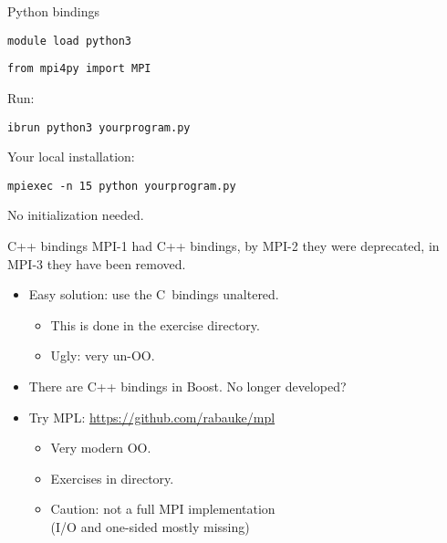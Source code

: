 \begin{numberedframe}{Python bindings}
\begin{verbatim}
module load python3
\end{verbatim}
\begin{verbatim}
from mpi4py import MPI
\end{verbatim}
Run:
\begin{tacc}
\begin{verbatim}
ibrun python3 yourprogram.py
\end{verbatim}
\end{tacc}
Your local installation:
\begin{verbatim}
mpiexec -n 15 python yourprogram.py
\end{verbatim}
No initialization needed.
\end{numberedframe}

\begin{numberedframe}{C++ bindings}
  MPI-1 had C++ bindings, by MPI-2 they were deprecated, in MPI-3 they have been removed.
  \begin{itemize}
  \item Easy solution: use the C~bindings unaltered.
    \begin{itemize}
    \item This is done in the  exercise directory.
    \item Ugly: very un-OO.
    \end{itemize}
  \item There are C++ bindings in Boost. No longer developed?
  \item Try MPL: \url{https://github.com/rabauke/mpl}
    \begin{itemize}
    \item Very modern OO.
    \item Exercises in  directory.
    \item Caution: not a full MPI implementation\\
      (I/O and one-sided mostly missing)
    \end{itemize}
  \end{itemize}
\end{numberedframe}

\begin{exerciseframe}[hello]
  
\end{exerciseframe}

